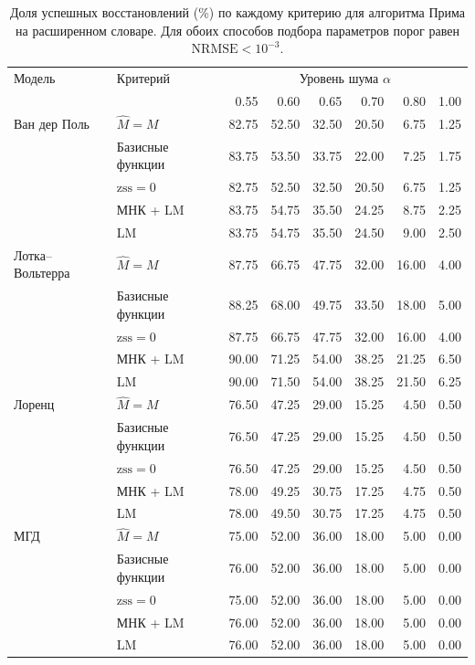 \documentclass[12pt]{article}
\begin{document}
\begin{table}[!htbp]
  \centering
  \small
  \setlength{\tabcolsep}{4pt}
  \caption{\protect\foreignlanguage{russian}{Доля успешных восстановлений (\%) по каждому критерию для алгоритма Прима на расширенном словаре. Для обоих способов подбора параметров порог равен $\mathrm{NRMSE}<10^{-3}$.}}
  \label{tab:physical-prim-criteria}
  \begin{otherlanguage}{russian}
  \begin{tabular}{llrrrrrr}
  \toprule
  Модель & Критерий & \multicolumn{6}{c}{Уровень шума $\alpha$}\\
   &  & 0.55 & 0.60 & 0.65 & 0.70 & 0.80 & 1.00\\
  \midrule
  Ван дер Поль & $\hat M=M$ & 82.75 & 52.50 & 32.50 & 20.50 & 6.75 & 1.25\\
   & Базисные функции & 83.75 & 53.50 & 33.75 & 22.00 & 7.25 & 1.75\\
   & $\mathrm{zss}=0$ & 82.75 & 52.50 & 32.50 & 20.50 & 6.75 & 1.25\\
   & МНК + LM & 83.75 & 54.75 & 35.50 & 24.25 & 8.75 & 2.25\\
   & LM & 83.75 & 54.75 & 35.50 & 24.50 & 9.00 & 2.50\\
  \addlinespace
  Лотка--Вольтерра & $\hat M=M$ & 87.75 & 66.75 & 47.75 & 32.00 & 16.00 & 4.00\\
   & Базисные функции & 88.25 & 68.00 & 49.75 & 33.50 & 18.00 & 5.00\\
   & $\mathrm{zss}=0$ & 87.75 & 66.75 & 47.75 & 32.00 & 16.00 & 4.00\\
   & МНК + LM & 90.00 & 71.25 & 54.00 & 38.25 & 21.25 & 6.50\\
   & LM & 90.00 & 71.50 & 54.00 & 38.25 & 21.50 & 6.25\\
  \addlinespace
  Лоренц & $\hat M=M$ & 76.50 & 47.25 & 29.00 & 15.25 & 4.50 & 0.50\\
    & Базисные функции & 76.50 & 47.25 & 29.00 & 15.25 & 4.50 & 0.50\\
    & $\mathrm{zss}=0$ & 76.50 & 47.25 & 29.00 & 15.25 & 4.50 & 0.50\\
    & МНК + LM & 78.00 & 49.25 & 30.75 & 17.25 & 4.75 & 0.50\\
    & LM & 78.00 & 49.50 & 30.75 & 17.25 & 4.75 & 0.50\\
  \addlinespace
  МГД & $\hat M=M$ & 75.00 & 52.00 & 36.00 & 18.00 & 5.00 & 0.00\\
   & Базисные функции & 76.00 & 52.00 & 36.00 & 18.00 & 5.00 & 0.00\\
   & $\mathrm{zss}=0$ & 75.00 & 52.00 & 36.00 & 18.00 & 5.00 & 0.00\\
   & МНК + LM & 76.00 & 52.00 & 36.00 & 18.00 & 5.00 & 0.00\\
   & LM & 76.00 & 52.00 & 36.00 & 18.00 & 5.00 & 0.00\\
  \bottomrule
  \end{tabular}
  \end{otherlanguage}
\end{table}
\end{document}
